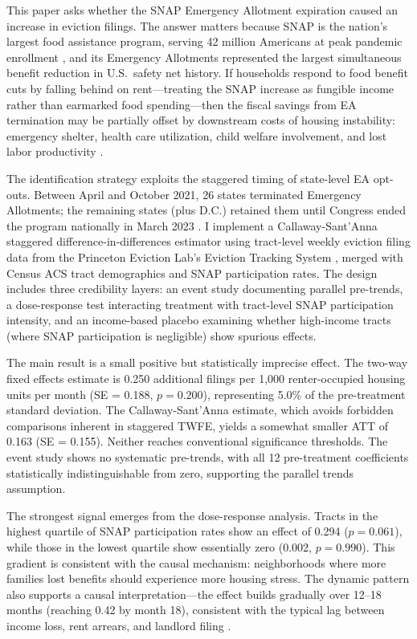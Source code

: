 \documentclass[12pt]{article}
\begin{document}
This paper asks whether the SNAP Emergency Allotment expiration caused an increase in eviction filings. The answer matters because SNAP is the nation's largest food assistance program, serving 42 million Americans at peak pandemic enrollment \citep{USDAFNS2023}, and its Emergency Allotments represented the largest simultaneous benefit reduction in U.S.\ safety net history. If households respond to food benefit cuts by falling behind on rent---treating the SNAP increase as fungible income rather than earmarked food spending---then the fiscal savings from EA termination may be partially offset by downstream costs of housing instability: emergency shelter, health care utilization, child welfare involvement, and lost labor productivity \citep{Desmond2016Evicted, CollinsonHumphries2023}.

The identification strategy exploits the staggered timing of state-level EA opt-outs. Between April and October 2021, 26 states terminated Emergency Allotments; the remaining states (plus D.C.) retained them until Congress ended the program nationally in March 2023 \citep{USDAFNS2023EA}. I implement a Callaway-Sant'Anna staggered difference-in-differences estimator using tract-level weekly eviction filing data from the Princeton Eviction Lab's Eviction Tracking System \citep{EvictionLab2024}, merged with Census ACS tract demographics and SNAP participation rates. The design includes three credibility layers: an event study documenting parallel pre-trends, a dose-response test interacting treatment with tract-level SNAP participation intensity, and an income-based placebo examining whether high-income tracts (where SNAP participation is negligible) show spurious effects.

The main result is a small positive but statistically imprecise effect. The two-way fixed effects estimate is 0.250 additional filings per 1,000 renter-occupied housing units per month (SE = 0.188, $p = 0.200$), representing 5.0\% of the pre-treatment standard deviation. The Callaway-Sant'Anna estimate, which avoids forbidden comparisons inherent in staggered TWFE, yields a somewhat smaller ATT of 0.163 (SE = 0.155). Neither reaches conventional significance thresholds. The event study shows no systematic pre-trends, with all 12 pre-treatment coefficients statistically indistinguishable from zero, supporting the parallel trends assumption.

The strongest signal emerges from the dose-response analysis. Tracts in the highest quartile of SNAP participation rates show an effect of 0.294 ($p = 0.061$), while those in the lowest quartile show essentially zero (0.002, $p = 0.990$). This gradient is consistent with the causal mechanism: neighborhoods where more families lost benefits should experience more housing stress. The dynamic pattern also supports a causal interpretation---the effect builds gradually over 12--18 months (reaching 0.42 by month 18), consistent with the typical lag between income loss, rent arrears, and landlord filing \citep{Gromis2022EvictionTimeline}.
\end{document}
